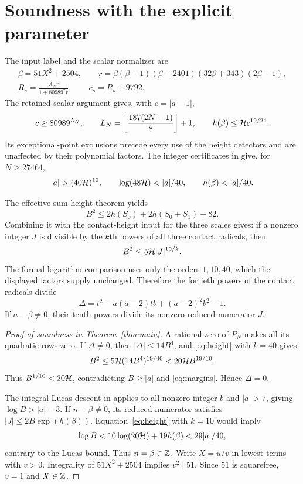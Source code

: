 \documentclass[11pt,a4paper]{article}
\theoremstyle{remark}\newtheorem{remark}[theorem]{Remark}
\begin{document}
\section{Soundness with the explicit parameter}
The input label and the scalar normalizer are
\[
 \begin{gathered}
 \beta=51X^2+2504,\qquad
 r=\beta(\beta-1)(\beta-2401)(32\beta+343)(2\beta-1),\\
 R_s=\frac{A_Nr}{1+80989^2r},\qquad c_s=R_s+9792.
 \end{gathered}
\]
The retained scalar argument gives, with $c=|a-1|$,
\[
 c\ge80989^{L_N},\qquad
 L_N=\left\lfloor\frac{187(2N-1)}8\right\rfloor+1,\qquad
 h(\beta)\le\mathcal H c^{19/24}.
\]
Its exceptional-point exclusions precede every use of the height
detectors and are unaffected by their polynomial factors. The integer
certificates in \cite{Baseline} give, for $N\ge27464$,
\begin{equation}\label{eq:margins}
 |a|>(40\HH)^{10},\qquad
 \log(48\HH)<|a|/40,\qquad h(\beta)<|a|/40.
\end{equation}

The effective sum-height theorem yields
\[
 B^2\le2h(S_0)+2h(S_0+S_1)+82.
\]
Combining it with the contact-height input for the three scales gives:
if a nonzero integer $J$ is divisible by the $k$th powers of all three
contact radicals, then
\begin{equation}\label{eq:height}
                          B^2\le5\mathcal H |J|^{19/k}.
\end{equation}
The formal logarithm comparison uses only the orders $1,10,40$,
which the displayed factors supply unchanged. Therefore the fortieth
powers of the contact radicals divide
\[
 \Delta=t^2-a(a-2)tb+(a-2)^2b^2-1.
\]
If $n-\beta\ne0$, their tenth powers divide its nonzero reduced
numerator $J$.

\begin{proof}[Proof of soundness in Theorem~\ref{thm:main}]
A rational zero of $P_N$ makes all its quadratic rows zero.
If $\Delta\ne0$, then $|\Delta|\le14B^4$, and \eqref{eq:height}
with $k=40$ gives
\[
 B^2\le5\mathcal H(14B^4)^{19/40}<20\mathcal H B^{19/10}.
\]
Thus $B^{1/10}<20\mathcal H$, contradicting $B\ge|a|$ and
\eqref{eq:margins}. Hence $\Delta=0$.

The integral Lucas descent in \cite[Section~5]{Source} applies to all
nonzero integer $b$ and $|a|>7$, giving $\log B>|a|-3$.
If $n-\beta\ne0$, its reduced numerator satisfies
$|J|\le2B\exp(h(\beta))$. Equation~\eqref{eq:height} with $k=10$
would imply
\[
 \log B<10\log(20\mathcal H)+19h(\beta)<29|a|/40,
\]
contrary to the Lucas bound. Thus $n=\beta\in\mathbb Z$. Write $X=u/v$
in lowest terms with $v>0$. Integrality of $51X^2+2504$ implies
$v^2\mid51$. Since $51$ is squarefree, $v=1$ and $X\in\mathbb Z$.
\end{proof}
\end{document}
